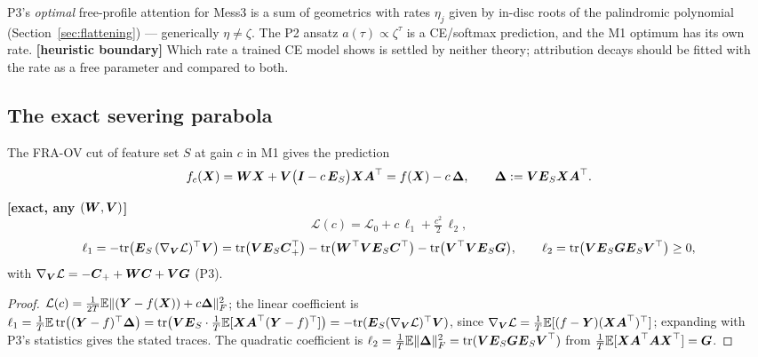 \documentclass{article}
\begin{document}
\begin{remark}
P3's \emph{optimal} free-profile attention for Mess3 is a sum of geometrics with rates $\eta_j$ given by in-disc roots of the palindromic polynomial (Section~\ref{sec:flattening}) --- generically $\eta \ne \zeta$. The P2 ansatz $a(\tau) \propto \zeta^\tau$ is a CE/softmax prediction, and the M1 optimum has its own rate. \textbf{[heuristic boundary]} Which rate a trained CE model shows is settled by neither theory; attribution decays should be fitted with the rate as a free parameter and compared to both.
\end{remark}

\subsection{The exact severing parabola}

The FRA-OV cut of feature set $S$ at gain $c$ in M1 gives the prediction
\begin{equation}
    f_c(\boldsymbol{X}) = \boldsymbol{W}\boldsymbol{X} + \boldsymbol{V}\big(\boldsymbol{I} - c\,\boldsymbol{E}_S\big)\boldsymbol{X}\boldsymbol{A}^\top = f(\boldsymbol{X}) - c\,\boldsymbol{\Delta},
    \qquad
    \boldsymbol{\Delta} := \boldsymbol{V}\boldsymbol{E}_S\boldsymbol{X}\boldsymbol{A}^\top .
\end{equation}

\begin{prop}\label{prop:parabola}
\textbf{[exact, any $(\boldsymbol{W}, \boldsymbol{V})$]}
\begin{equation}
    \mathcal{L}(c) = \mathcal{L}_0 + c\,\ell_1 + \tfrac{c^2}{2}\,\ell_2 ,
\end{equation}
\begin{equation}
    \ell_1 = -\textrm{tr}\big(\boldsymbol{E}_S\,(\nabla_{\boldsymbol{V}}\mathcal{L})^\top\boldsymbol{V}\big)
    = \textrm{tr}\big(\boldsymbol{V}\boldsymbol{E}_S\boldsymbol{C}_+^\top\big) - \textrm{tr}\big(\boldsymbol{W}^\top\boldsymbol{V}\boldsymbol{E}_S\boldsymbol{C}^\top\big) - \textrm{tr}\big(\boldsymbol{V}^\top\boldsymbol{V}\boldsymbol{E}_S\boldsymbol{G}\big),
    \qquad
    \ell_2 = \textrm{tr}\big(\boldsymbol{V}\boldsymbol{E}_S\boldsymbol{G}\boldsymbol{E}_S\boldsymbol{V}^\top\big) \ge 0 ,
\end{equation}
with $\nabla_{\boldsymbol{V}}\mathcal{L} = -\boldsymbol{C}_+ + \boldsymbol{W}\boldsymbol{C} + \boldsymbol{V}\boldsymbol{G}$ (P3).
\end{prop}
\begin{proof}
$\mathcal{L}(c) = \frac{1}{2T}\mathbb{E}\Vert {(\boldsymbol{Y}- f(\boldsymbol{X})) + c\boldsymbol{\Delta}} \Vert_{F}^2$; the linear coefficient is $\ell_1 = \frac1T\mathbb{E}\,\textrm{tr}\big((\boldsymbol{Y} - f)^\top\boldsymbol{\Delta}\big) = \textrm{tr}\big(\boldsymbol{V}\boldsymbol{E}_S\cdot\frac1T\mathbb{E}[\boldsymbol{X}\boldsymbol{A}^\top(\boldsymbol{Y} - f)^\top]\big) = -\textrm{tr}(\boldsymbol{E}_S(\nabla_{\boldsymbol{V}}\mathcal{L})^\top\boldsymbol{V})$, since $\nabla_{\boldsymbol{V}}\mathcal{L} = \frac1T\mathbb{E}[(f - \boldsymbol{Y})(\boldsymbol{X}\boldsymbol{A}^\top)^\top]$; expanding with P3's statistics gives the stated traces. The quadratic coefficient is $\ell_2 = \frac1T\mathbb{E}\Vert {\boldsymbol{\Delta}} \Vert_{F}^2 = \textrm{tr}(\boldsymbol{V}\boldsymbol{E}_S\boldsymbol{G}\boldsymbol{E}_S\boldsymbol{V}^\top)$ from $\frac1T\mathbb{E}[\boldsymbol{X}\boldsymbol{A}^\top\boldsymbol{A}\boldsymbol{X}^\top] = \boldsymbol{G}$.
\end{proof}
\end{document}
